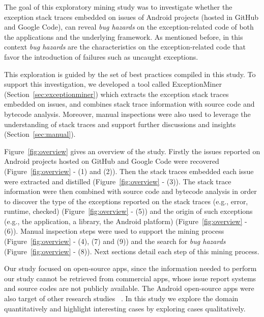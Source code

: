 \documentclass[conference]{IEEEtran}
\begin{document}
The goal of this exploratory mining study was to investigate whether the exception stack traces 
embedded on issues of Android projects (hosted in GitHub and Google Code), can reveal 
\emph{bug hazards} on the exception-related code of both the applications and the underlying framework. 
As mentioned before, in this context \emph{bug hazards} are the characteristics on the exception-related code 
that favor the introduction of failures such as uncaught exceptions. 

This exploration is guided by the set of best practices compiled in this study.
To support this investigation, we developed a tool called ExceptionMiner (Section~\ref{sec:exceptionminer})
which extracts the exception stack traces embedded on issues, 
and combines stack trace information with source code and bytecode 
analysis. Moreover, manual inspections were also used to leverage
 the understanding of stack traces and support further discussions and insights (Section~\ref{sec:manual}).

Figure~\ref{fig:overview} gives an overview of the study.
Firstly  the issues reported on Android projects hosted on GitHub and Google Code were recovered (Figure~\ref{fig:overview} - (1) and (2)).
Then the stack traces embedded each issue were extracted and distilled (Figure~\ref{fig:overview} - (3)).
The stack trace information were then combined with source code and bytecode analysis in order to discover 
the type of the exceptions reported on the stack traces (e.g., error, runtime, checked)  (Figure~\ref{fig:overview} - (5))  and the origin of such exceptions 
(e.g., the application, a library, the Android platform)  (Figure~\ref{fig:overview} - (6)). 
Manual inspection steps were used to support the mining process (Figure~\ref{fig:overview} - (4), (7) and (9)) and 
the search for \emph{bug hazards}  (Figure~\ref{fig:overview} - (8)). Next sections detail each step of this mining process.

Our study focused on open-source apps, since the information needed to perform our study
cannot be retrieved from commercial apps, whose issue report systems and 
source codes are not publicly available. The Android open-source apps were also 
target of other research studies ~\cite{Linar13,ahimed}.   
In this study we explore the domain quantitatively and highlight interesting cases by 
exploring cases qualitatively. 

\end{document}
